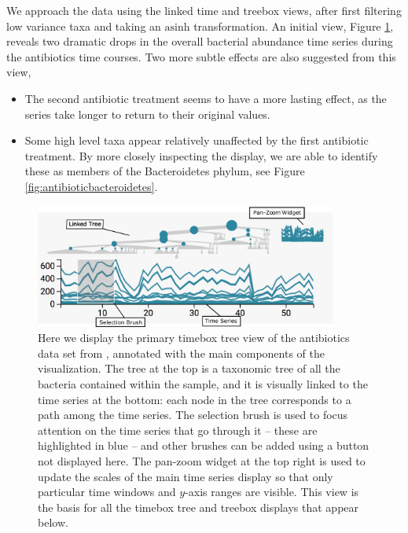 We approach the data using the linked time and treebox views, after first
filtering low variance taxa and taking an \(\text{asinh}\) transformation. An
initial view, Figure \ref{fig:antibioticoverview}, reveals two dramatic drops in
the overall bacterial abundance time series during the antibiotics time courses.
Two more subtle effects are also suggested from this view,

\begin{itemize}
\item
  The second antibiotic treatment seems to have a more lasting effect,
  as the series take longer to return to their original values.
\item
  Some high level taxa appear relatively unaffected by the first
  antibiotic treatment. By more closely inspecting the display, we are
  able to identify these as members of the Bacteroidetes phylum, see
  Figure \ref{fig:antibioticbacteroidetes}.
\end{itemize}

\begin{figure}
  \centering
  \includegraphics[width=375px]{figure/treelapse/annotated_antibiotic_overview}
  \caption{Here we display the primary timebox tree view of the antibiotics data
    set from \cite{dethlefsen2008pervasive}, annotated with the main components of the
    visualization. The tree at the top is a taxonomic tree of all the bacteria
    contained within the sample, and it is visually linked to the time series at
    the bottom: each node in the tree corresponds to a path among the time series.
    The selection brush is used to focus attention on the time series that go
    through it -- these are highlighted in blue -- and other brushes can be added
    using a button not displayed here. The pan-zoom widget at the top right is
    used to update the scales of the main time series display so that only
    particular time windows and $y$-axis ranges are visible. This view is the
    basis for all the timebox tree and treebox displays that appear
    below. \label{fig:antibioticoverview}}
\end{figure}

